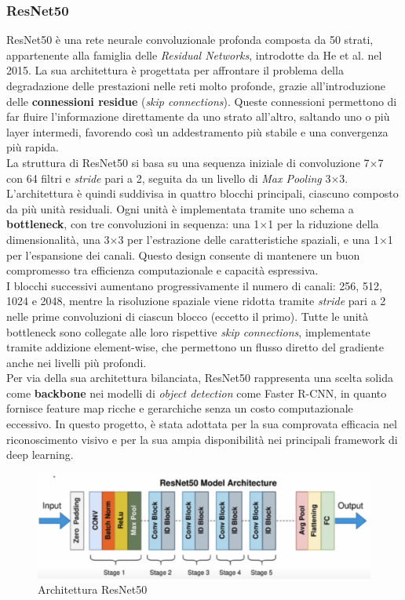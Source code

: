 \documentclass[12pt]{article}
\begin{document}
\subsubsection{ResNet50}
ResNet50\cite{ResNet50} è una rete neurale convoluzionale profonda composta da 50 strati, appartenente alla famiglia delle \textit{Residual Networks}, introdotte da He et al. nel 2015. La sua architettura è progettata per affrontare il problema della degradazione delle prestazioni nelle reti molto profonde, grazie all’introduzione delle \textbf{connessioni residue} (\textit{skip connections}). Queste connessioni permettono di far fluire l’informazione direttamente da uno strato all’altro, saltando uno o più layer intermedi, favorendo così un addestramento più stabile e una convergenza più rapida.\\
La struttura di ResNet50 si basa su una sequenza iniziale di convoluzione 7$\times$7 con 64 filtri e \textit{stride} pari a 2, seguita da un livello di \textit{Max Pooling} 3$\times$3. L’architettura è quindi suddivisa in quattro blocchi principali, ciascuno composto da più unità residuali. Ogni unità è implementata tramite uno schema a \textbf{bottleneck}, con tre convoluzioni in sequenza: una 1$\times$1 per la riduzione della dimensionalità, una 3$\times$3 per l’estrazione delle caratteristiche spaziali, e una 1$\times$1 per l’espansione dei canali. Questo design consente di mantenere un buon compromesso tra efficienza computazionale e capacità espressiva.\\
I blocchi successivi aumentano progressivamente il numero di canali: 256, 512, 1024 e 2048, mentre la risoluzione spaziale viene ridotta tramite \textit{stride} pari a 2 nelle prime convoluzioni di ciascun blocco (eccetto il primo). Tutte le unità bottleneck sono collegate alle loro rispettive \textit{skip connections}, implementate tramite addizione element-wise, che permettono un flusso diretto del gradiente anche nei livelli più profondi.\\
Per via della sua architettura bilanciata, ResNet50 rappresenta una scelta solida come \textbf{backbone} nei modelli di \textit{object detection} come Faster R-CNN, in quanto fornisce feature map ricche e gerarchiche senza un costo computazionale eccessivo. In questo progetto, è stata adottata per la sua comprovata efficacia nel riconoscimento visivo e per la sua ampia disponibilità nei principali framework di deep learning.

\begin{figure}[H]
    \centering
    \includegraphics[width=1.00\textwidth]{./img/resnet50.png}
    \caption{Architettura ResNet50}
    \label{fig:resnet50}
\end{figure}
\end{document}

